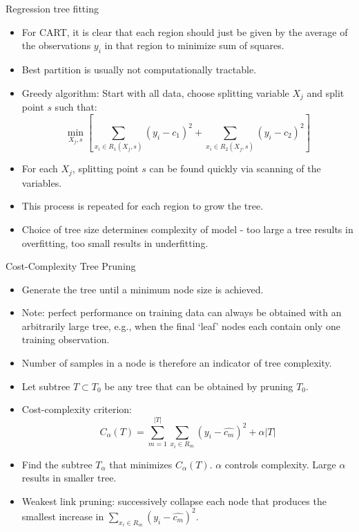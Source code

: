 \documentclass{beamer}
\begin{document}
\begin{frame}{Regression tree fitting}
    \begin{itemize}
        \item For CART, it is clear that each region should just be given by the average of the observations $y_i$ in that region to minimize sum of squares.
        \item Best partition is usually not computationally tractable.
        \item Greedy algorithm: Start with all data, choose splitting variable $X_j$ and split point $s$ such that:
        \begin{equation*}
            \min_{X_j, s} \left[ \sum_{x_i \in R_1(X_j, s)} (y_i - c_1)^2 + \sum_{x_i \in R_2(X_j, s)} (y_i - c_2)^2 \right]
        \end{equation*}
        \item For each $X_j$, splitting point $s$ can be found quickly via scanning of the variables.
        \item This process is repeated for each region to grow the tree.
        \item Choice of tree size determines complexity of model - too large a tree results in overfitting, too small results in underfitting.
    \end{itemize}
\end{frame}


\begin{frame}{Cost-Complexity Tree Pruning}
    \begin{itemize}
        \item Generate the tree until a minimum node size is achieved. 
        \item Note: perfect performance on training data can always be obtained with an arbitrarily large tree, e.g., when the final `leaf' nodes each contain only one training observation.
        \item Number of samples in a node is therefore an indicator of tree complexity.
        \item Let subtree $T \subset T_0$ be any tree that can be obtained by pruning $T_0$.
        \item Cost-complexity criterion:
        \begin{equation*}
            C_{\alpha}(T) = \sum_{m=1}^{|T|} \sum_{x_i \in R_m} (y_i - \hat{c_m})^2 + \alpha |T|
        \end{equation*}
        \item Find the subtree $T_\alpha$ that minimizes $C_{\alpha}(T)$. $\alpha$ controls complexity. Large $\alpha$ results in smaller tree.
        \item Weakest link pruning: successively collapse each node that produces the smallest increase in $\sum_{x_i \in R_m} (y_i - \hat{c_m})^2$.
    \end{itemize}
\end{frame}
\end{document}
